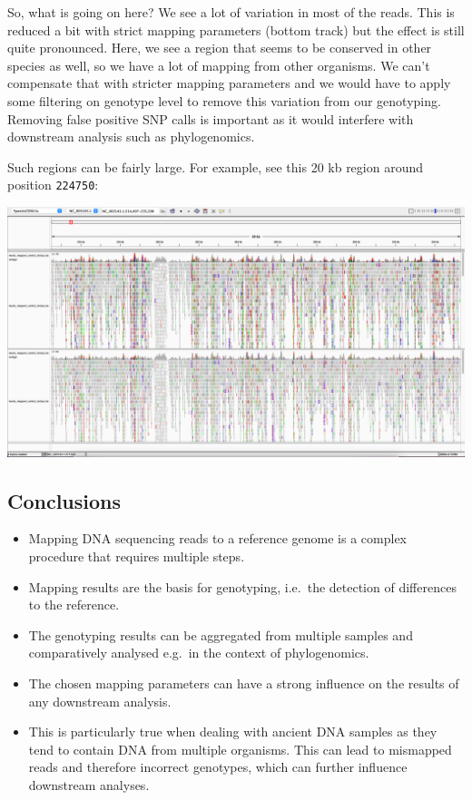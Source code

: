 \documentclass[
  letterpaper,
]{book}
\providecommand{\tightlist}{%
  \setlength{\itemsep}{0pt}\setlength{\parskip}{0pt}}\usepackage{longtable,booktabs,array}
\begin{document}
So, what is going on here? We see a lot of variation in most of the
reads. This is reduced a bit with strict mapping parameters (bottom
track) but the effect is still quite pronounced. Here, we see a region
that seems to be conserved in other species as well, so we have a lot of
mapping from other organisms. We can't compensate that with stricter
mapping parameters and we would have to apply some filtering on genotype
level to remove this variation from our genotyping. Removing false
positive SNP calls is important as it would interfere with downstream
analysis such as phylogenomics.

Such regions can be fairly large. For example, see this 20 kb region
around position \texttt{224750}:

\includegraphics{assets/images/chapters/genome-mapping/IGV_SNP_224750.png}

\hypertarget{conclusions}{%
\subsection{Conclusions}\label{conclusions}}

\begin{itemize}
\tightlist
\item
  Mapping DNA sequencing reads to a reference genome is a complex
  procedure that requires multiple steps.
\item
  Mapping results are the basis for genotyping, i.e.~the detection of
  differences to the reference.
\item
  The genotyping results can be aggregated from multiple samples and
  comparatively analysed e.g.~in the context of phylogenomics.
\item
  The chosen mapping parameters can have a strong influence on the
  results of any downstream analysis.
\item
  This is particularly true when dealing with ancient DNA samples as
  they tend to contain DNA from multiple organisms. This can lead to
  mismapped reads and therefore incorrect genotypes, which can further
  influence downstream analyses.
\end{itemize}
\end{document}
